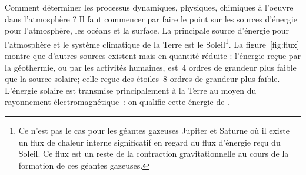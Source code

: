 \bk
Comment déterminer les processus dynamiques, physiques, chimiques à l'oeuvre dans l'atmosphère ? Il faut commencer par faire le point sur les sources d'énergie pour l'atmosphère, les océans et la surface. La principale source d'énergie pour l'atmosphère et le système climatique de la Terre est le Soleil\footnote{Ce n'est pas le cas pour les géantes gazeuses Jupiter et Saturne où il existe un flux de chaleur interne significatif en regard du flux d'énergie reçu du Soleil. Ce flux est un reste de la contraction gravitationnelle au cours de la formation de ces géantes gazeuses.}. La figure~\ref{fig:flux} montre que d’autres sources existent mais en quantité réduite : l'énergie reçue par la géothermie, ou par les activités humaines, est~$4$ ordres de grandeur plus faible que la source solaire; celle reçue des étoiles~$8$ ordres de grandeur plus faible. L’énergie solaire est transmise principalement à la Terre au moyen du rayonnement électromagnétique~: on qualifie cette énergie de . %


